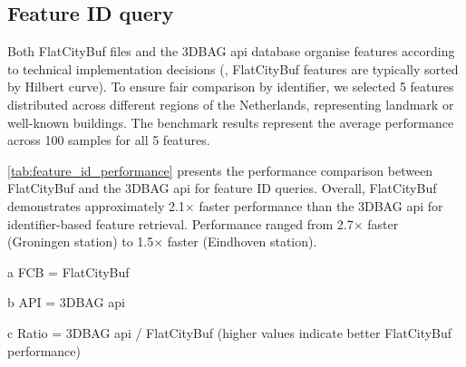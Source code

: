\subsection{Feature ID query}
\label{result:benchmark_over_the_web:feature_id_query}

Both FlatCityBuf files and the 3DBAG \ac{api} database organise features according to technical implementation decisions (\eg, FlatCityBuf features are typically sorted by Hilbert curve). To ensure fair comparison by identifier, we selected 5 features distributed across different regions of the Netherlands, representing landmark or well-known buildings. The benchmark results represent the average performance across 100 samples for all 5 features.

\autoref{tab:feature_id_performance} presents the performance comparison between FlatCityBuf and the 3DBAG \ac{api} for feature ID queries. Overall, FlatCityBuf demonstrates approximately 2.1$\times$ faster performance than the 3DBAG \ac{api} for identifier-based feature retrieval. Performance ranged from 2.7$\times$ faster (Groningen station) to 1.5$\times$ faster (Eindhoven station).

\begin{table}[ht]
  \centering
  \caption{Feature ID query performance comparison between FlatCityBuf and 3DBAG API}
  \label{tab:feature_id_performance}

  \begin{tablenotes}[flushleft]
    \footnotesize
  \item[a] FCB = FlatCityBuf
  \item[b] API = 3DBAG \ac{api}
  \item[c] Ratio = 3DBAG \ac{api} / FlatCityBuf (higher values indicate better FlatCityBuf performance)
  \end{tablenotes}
\end{table}

